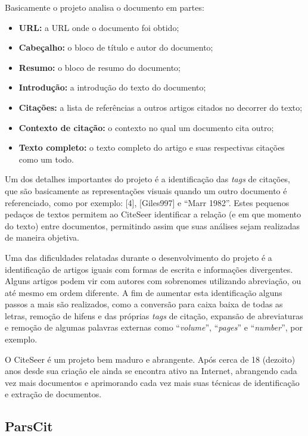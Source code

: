 Basicamente o projeto analisa o documento em partes:

\begin{itemize}
    \item \textbf{URL:} a URL onde o documento foi obtido;
    \item \textbf{Cabeçalho:} o bloco de título e autor do documento;
    \item \textbf{Resumo:} o bloco de resumo do documento;
    \item \textbf{Introdução:} a introdução do texto do documento;
    \item \textbf{Citações:} a lista de referências a outros artigos citados no decorrer do texto;
    \item \textbf{Contexto de citação:} o contexto no qual um documento cita outro;
    \item \textbf{Texto completo:} o texto completo do artigo e suas respectivas citações como um todo.
\end{itemize}

Um dos detalhes importantes do projeto é a identificação das \textit{tags} de citações, que são basicamente as representações visuais quando um outro documento é referenciado, como por exemplo: [4], [Giles997] e ``Marr 1982''. Estes pequenos pedaços de textos permitem ao CiteSeer identificar a relação (e em que momento do texto) entre documentos, permitindo assim que suas análises sejam realizadas de maneira objetiva.

Uma das dificuldades relatadas durante o desenvolvimento do projeto é a identificação de artigos iguais com formas de escrita e informações divergentes. Alguns artigos podem vir com autores com sobrenomes utilizando abreviação, ou até mesmo em ordem diferente. A fim de aumentar esta identificação alguns passos a mais são realizados, como a conversão para caixa baixa de todas as letras, remoção de hifens e das próprias \textit{tags} de citação, expansão de abreviaturas e remoção de algumas palavras externas como ``\textit{volume}'', ``\textit{pages}'' e ``\textit{number}'', por exemplo.

O CiteSeer é um projeto bem maduro e abrangente. Após cerca de 18 (dezoito) anos desde sua criação ele ainda se encontra ativo na Internet, abrangendo cada vez mais documentos e aprimorando cada vez mais suas técnicas de identificação e extração de documentos.

\subsection{ParsCit}
\label{ssec:parscit}

